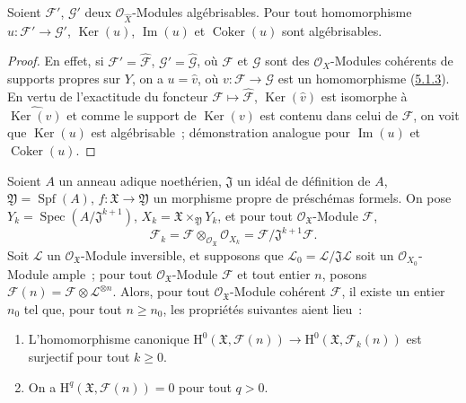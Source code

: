 \begin{lemma}[5.2.2]
\label{III.5.2.2-fr}
Soient $\mathcal F'$, $\mathcal G'$ deux $\mathcal O_{\widehat X}$-Modules
algébrisables. Pour tout homomorphisme $u:\mathcal F'\to\mathcal G'$,
$\operatorname{Ker}(u)$, $\operatorname{Im}(u)$ et $\operatorname{Coker}(u)$ sont
algébrisables.
\end{lemma}

\begin{proof}
En effet, si $\mathcal F'=\widehat{\mathcal F}$,
$\mathcal G'=\widehat{\mathcal G}$, où $\mathcal F$ et $\mathcal G$ sont des
$\mathcal O_X$-Modules cohérents de supports propres sur $Y$, on a
$u=\widehat v$, où $v:\mathcal F\to\mathcal G$ est un homomorphisme
(\hyperref[III.5.1.3-fr]{5.1.3}). En vertu de l'exactitude du foncteur
$\mathcal F\mapsto\widehat{\mathcal F}$,
$\operatorname{Ker}(\widehat v)$ est isomorphe à
$\widehat{\operatorname{Ker}(v)}$ et comme le support de
$\operatorname{Ker}(v)$ est contenu dans celui de $\mathcal F$, on voit que
$\operatorname{Ker}(u)$ est algébrisable~; démonstration analogue pour
$\operatorname{Im}(u)$ et $\operatorname{Coker}(u)$.
\end{proof}

\begin{proposition}[5.2.3]
\label{III.5.2.3-fr}
Soient $A$ un anneau adique noethérien, $\mathfrak J$ un idéal de définition de
$A$, $\mathfrak Y=\operatorname{Spf}(A)$,
$f:\mathfrak X\to\mathfrak Y$ un morphisme propre de préschémas formels. On pose
$Y_k=\operatorname{Spec}(A/\mathfrak J^{k+1})$,
$X_k=\mathfrak X\times_{\mathfrak Y}Y_k$, et pour tout
$\mathcal O_{\mathfrak X}$-Module $\mathcal F$,
\[
\mathcal F_k=\mathcal F\otimes_{\mathcal O_{\mathfrak X}}\mathcal O_{X_k}
=\mathcal F/\mathfrak J^{k+1}\mathcal F.
\]
Soit $\mathcal L$ un $\mathcal O_{\mathfrak X}$-Module inversible, et supposons que
$\mathcal L_0=\mathcal L/\mathfrak J\mathcal L$ soit un
$\mathcal O_{X_0}$-Module ample~; pour tout $\mathcal O_{\mathfrak X}$-Module
$\mathcal F$ et tout entier $n$, posons
$\mathcal F(n)=\mathcal F\otimes\mathcal L^{\otimes n}$. Alors, pour tout
$\mathcal O_{\mathfrak X}$-Module cohérent $\mathcal F$, il existe un entier $n_0$
tel que, pour tout $n\geq n_0$, les propriétés suivantes aient lieu~:
\begin{enumerate}
\item[(i)] L'homomorphisme canonique
$\mathrm H^0(\mathfrak X,\mathcal F(n))\to
\mathrm H^0(\mathfrak X,\mathcal F_k(n))$ est surjectif pour tout $k\geq0$.
\item[(ii)] On a $\mathrm H^q(\mathfrak X,\mathcal F(n))=0$ pour tout $q>0$.
\end{enumerate}
\end{proposition}

